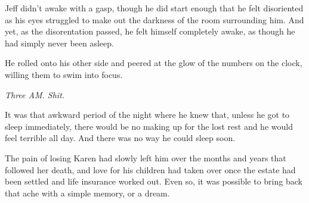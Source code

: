 Jeff didn't awake with a gasp, though he did start enough that he felt disoriented as his eyes struggled to make out the darkness of the room surrounding him.  And yet, as the disorentation passed, he felt himself completely awake, as though he had simply never been asleep.

He rolled onto his other side and peered at the glow of the numbers on the clock, willing them to swim into focus.

\textit{Three AM.  Shit.}

It was that awkward period of the night where he knew that, unless he got to sleep immediately, there would be no making up for the lost rest and he would feel terrible all day.  And there was no way he could sleep soon.

The pain of losing Karen had slowly left him over the months and years that followed her death, and love for his children had taken over once the estate had been settled and life insurance worked out.  Even so, it was possible to bring back that ache with a simple memory, or a dream.
